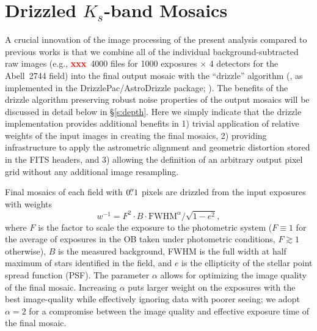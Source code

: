 \documentclass[preprint2]{aastex6}
\newcommand\xxx{{\textcolor{red}{\bf xxx}}}
\begin{document}
\section{Drizzled $K_s$-band Mosaics}
\label{s:mosaic}

A crucial innovation of the image processing of the present analysis compared to previous works is that we combine all of the individual background-subtracted raw images (e.g., \xxx\ 4000 files for 1000 exposures $\times$ 4 detectors for the \mbox{Abell 2744} field) into the final output mosaic with the ``drizzle'' algorithm (\citealp{fruchter:02}, as implemented in the DrizzlePac/AstroDrizzle package; \citealp{drizzlepac}).  The benefits of the drizzle algorithm  preserving robust noise properties of the output mosaics will be discussed in detail below in \S\ref{s:depth}.  Here we simply indicate that the drizzle implementation provides additional benefits in 1) trivial application of relative weights of the input images in creating the final mosaics, 2) providing infrastructure to apply the astrometric alignment and geometric distortion stored in the FITS headers, and 3) allowing the definition of an arbitrary output pixel grid without any additional image resampling.

Final mosaics of each field with $0\mbox{$.\!\!^{\prime\prime}$}1$ pixels are drizzled from the input exposures with weights
\begin{equation}
w^{-1} = F^2\cdot B \cdot \mathrm{FWHM}^\alpha / \sqrt{1-e^2}, 
\label{eq:weight}
\end{equation}
where $F$ is the factor to scale the exposure to the photometric system ($F\equiv1$ for the average of exposures in the OB taken under photometric conditions, $F\gtrsim1$ otherwise), $B$ is the measured background, FWHM is the full width at half maximum of stars identified in the field, and $e$ is the ellipticity of the stellar point spread function (PSF).  The parameter $\alpha$ allows for optimizing the image quality of the final mosaic.  Increasing $\alpha$ puts larger weight on the exposures with the best image-quality while effectively ignoring data with poorer seeing; we adopt $\alpha=2$ for a compromise between the image quality and effective exposure time of the final mosaic.  
\end{document}
